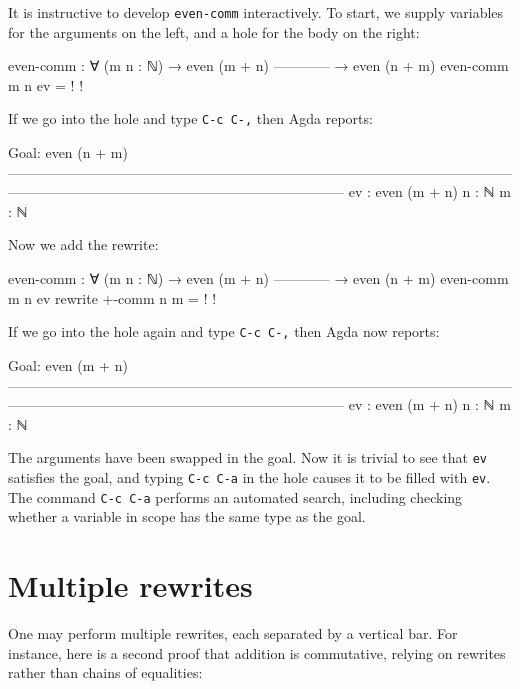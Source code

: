 It is instructive to develop \texttt{even-comm} interactively. To start,
we supply variables for the arguments on the left, and a hole for the
body on the right:

\begin{myDisplay}
even-comm : ∀ (m n : ℕ)
  → even (m + n)
    ------------
  → even (n + m)
even-comm m n ev = {! !}
\end{myDisplay}

If we go into the hole and type \texttt{C-c\ C-,} then Agda reports:

\begin{myDisplay}
Goal: even (n + m)
————————————————————————————————————————————————————————————
ev : even (m + n)
n  : ℕ
m  : ℕ
\end{myDisplay}

Now we add the rewrite:

\begin{myDisplay}
even-comm : ∀ (m n : ℕ)
  → even (m + n)
    ------------
  → even (n + m)
even-comm m n ev rewrite +-comm n m = {! !}
\end{myDisplay}

If we go into the hole again and type \texttt{C-c\ C-,} then Agda now
reports:

\begin{myDisplay}
Goal: even (m + n)
————————————————————————————————————————————————————————————
ev : even (m + n)
n  : ℕ
m  : ℕ
\end{myDisplay}

The arguments have been swapped in the goal. Now it is trivial to see
that \texttt{ev} satisfies the goal, and typing \texttt{C-c\ C-a} in the
hole causes it to be filled with \texttt{ev}. The command
\texttt{C-c\ C-a} performs an automated search, including checking
whether a variable in scope has the same type as the goal.

\hypertarget{multiple-rewrites}{%
\section{Multiple rewrites}\label{multiple-rewrites}}

One may perform multiple rewrites, each separated by a vertical bar. For
instance, here is a second proof that addition is commutative, relying
on rewrites rather than chains of equalities:

